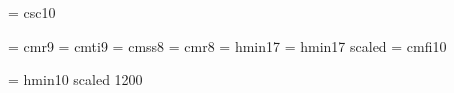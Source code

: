 






\hoffset-4mm
\voffset-13mm



\Internote

\font\caps = \fontid csc10

\font\rmlyrics = cmr9
\font\itlyrics = cmti9
\font\notelett = cmss8
\font\smallrm = cmr8
\font\titelll = hmin17 %
\font\titell = hmin17 scaled
\font\funny = cmfi10

\let\textini=\textinitial

\def\textinitial#1#2{\textini#1{\caps#2}}


\def\ngl#1{\cchar{-6}{\itlyrics #1}}
\def\engl#1{\cchar{-7}{\itlyrics #1}}
\def\sengl#1{\cchar{-9}{\itlyrics #1}}
\def\subengl#1{\cchar{-13}{\itlyrics #1}}


\def\bgenerale{\ateverysystem{\znotes\bmolle b\gen}}

\font\biggish = hmin10 scaled 1200

\def\section#1{{\medskip \biggish #1 \smallskip}}
\def\subsection*#1{{\medskip \biggish #1 \smallskip}}
\def\littlehead#1{{\noindent\bf #1}}

\def\bibleref#1#2{\line{#2 \hfill  \it #1}}

\def\celebrant{Celebrant:\ }
\def\all{{All:}\phantom{nebranl}}
\def\deacon{Deacon:\phantom{om}}
\def\rubrics#1{{\noindent\it #1}}


\def\marginote#1{\ifodd\pageno \rightnote{#1} \else \leftnote{#1} \fi}
\def\leftnote#1{\moveleft12mm\vbox to 0mm{\hsize12mm \notelett #1}}
\def\rightnote#1{\moveright107mm\vbox to 0mm{\hsize12mm \notelett #1}}

\def\stand{\marginote{STAND}}
\def\sit{\marginote{\quad SIT}}
\def\kneel{\marginote{KNEEL}}



